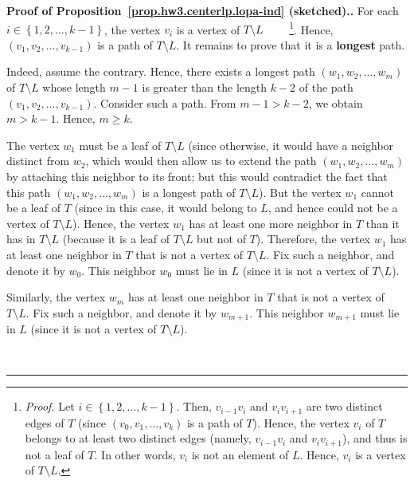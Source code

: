 \documentclass[numbers=enddot,12pt,final,onecolumn,notitlepage]{scrartcl}%
\theoremstyle{definition}
\newenvironment{proof}[1][Proof]{\noindent\textbf{#1.} }{\ \rule{0.5em}{0.5em}}
\newcommand{\set}[1]{\left\{ #1 \right\}}
\newcommand{\tup}[1]{\left( #1 \right)}
\begin{document}
\begin{proof}[Proof of Proposition~\ref{prop.hw3.centerlp.lopa-ind}
(sketched).]
For each $i \in \set{1, 2, \ldots, k-1}$, the vertex $v_i$ is a vertex
of $T \setminus L$ \ \ \ \ \footnote{\textit{Proof.}
  Let
  $i \in \set{1, 2, \ldots, k-1}$.
  Then, $v_{i-1} v_i$ and $v_i v_{i+1}$ are two distinct edges
  of $T$ (since $\tup{v_0, v_1, \ldots, v_k}$ is a path of $T$).
  Hence, the vertex $v_i$ of $T$
  belongs to at least two distinct edges (namely, $v_{i-1} v_i$ and
  $v_i v_{i+1}$), and thus is not a leaf of $T$.
  In other words, $v_i$ is not an element of $L$.
  Hence, $v_i$ is a vertex of $T \setminus L$.}.
Hence, $\tup{v_1, v_2, \ldots, v_{k-1}}$ is a path of
$T \setminus L$.
It remains to prove that it is a \textbf{longest} path.

Indeed, assume the contrary.
Hence, there exists a longest path
$\tup{w_1, w_2, \ldots, w_m}$ of $T \setminus L$ whose length $m-1$
is greater than the length $k-2$ of the path
$\tup{v_1, v_2, \ldots, v_{k-1}}$.
Consider such a path.
From $m-1 > k-2$, we obtain $m > k-1$. Hence, $m \geq k$.

The vertex $w_1$ must be a leaf of $T \setminus L$ (since otherwise,
it would have a neighbor distinct from $w_2$, which would then allow
us to extend the path $\tup{w_1, w_2, \ldots, w_m}$ by attaching
this neighbor to its front; but this would contradict the fact that
this path $\tup{w_1, w_2, \ldots, w_m}$ is a longest path of
$T \setminus L$).
But the vertex $w_1$ cannot be a leaf of $T$ (since in this case,
it would belong to $L$, and hence could not be a vertex
of $T \setminus L$).
Hence, the vertex $w_1$ has at least one more neighbor in $T$ than
it has in $T \setminus L$ (because it is a leaf of $T \setminus L$
but not of $T$).
Therefore, the vertex $w_1$ has at least one neighbor in $T$ that is
not a vertex of $T \setminus L$.
Fix such a neighbor, and denote it by $w_0$.
This neighbor $w_0$ must lie in $L$ (since it is not a vertex of
$T \setminus L$).

Similarly, the vertex $w_m$ has at least one neighbor in $T$ that is
not a vertex of $T \setminus L$.
Fix such a neighbor, and denote it by $w_{m+1}$.
This neighbor $w_{m+1}$ must lie in $L$ (since it is not a vertex of
$T \setminus L$).


\end{proof}
\end{document}
